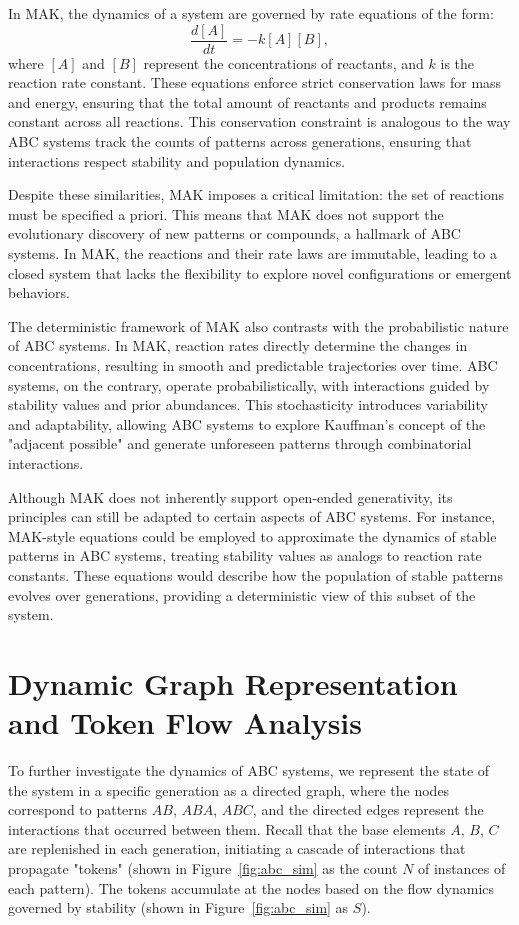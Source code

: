 \documentclass[entropy,article,submit,pdftex,oneauthor]{Definitions/mdpi}
\begin{document}
In MAK, the dynamics of a system are governed by rate equations of the form:
\begin{equation}
\frac{d[A]}{dt} = -k[A][B],
\end{equation}
where \( [A] \) and \( [B] \) represent the concentrations of reactants, and \( k \) is the reaction rate constant. These equations enforce strict conservation laws for mass and energy, ensuring that the total amount of reactants and products remains constant across all reactions. This conservation constraint is analogous to the way ABC systems track the counts of patterns across generations, ensuring that interactions respect stability and population dynamics.

Despite these similarities, MAK imposes a critical limitation: the set of reactions must be specified a priori. This means that MAK does not support the evolutionary discovery of new patterns or compounds, a hallmark of ABC systems. In MAK, the reactions and their rate laws are immutable, leading to a closed system that lacks the flexibility to explore novel configurations or emergent behaviors.

The deterministic framework of MAK also contrasts with the probabilistic nature of ABC systems. In MAK, reaction rates directly determine the changes in concentrations, resulting in smooth and predictable trajectories over time. ABC systems, on the contrary, operate probabilistically, with interactions guided by stability values and prior abundances. This stochasticity introduces variability and adaptability, allowing ABC systems to explore Kauffman's concept of the "adjacent possible" \cite{kauffman1996investigations} and generate unforeseen patterns through combinatorial interactions.

Although MAK does not inherently support open-ended generativity, its principles can still be adapted to certain aspects of ABC systems. For instance, MAK-style equations could be employed to approximate the dynamics of stable patterns in ABC systems, treating stability values as analogs to reaction rate constants. These equations would describe how the population of stable patterns evolves over generations, providing a deterministic view of this subset of the system.

\section{Dynamic Graph Representation and Token Flow Analysis}

To further investigate the dynamics of ABC systems, we represent the state of the system in a specific generation as a directed graph, where the nodes correspond to patterns $AB$, $ABA$, $ABC$, and the directed edges represent the interactions that occurred between them. Recall that the base elements $A$, $B$, $C$ are replenished in each generation, initiating a cascade of interactions that propagate "tokens" (shown in Figure~\ref{fig:abc_sim} as the count $N$ of instances of each pattern). The tokens accumulate at the nodes based on the flow dynamics governed by stability (shown in Figure~\ref{fig:abc_sim} as $S$).
\end{document}
